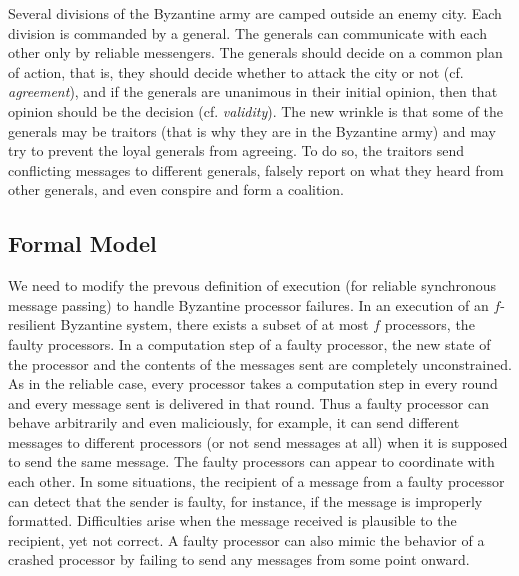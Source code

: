 \documentclass{article}
\begin{document}
Several divisions of the Byzantine army are camped outside an enemy city. Each division is commanded by a general. The generals can communicate with each other only by reliable messengers. The generals should decide on a common plan of action, that is, they should decide whether to attack the city or not (cf. \textit{agreement}), and if the generals are unanimous in their initial opinion, then that opinion should be the decision (cf. \textit{validity}). The new wrinkle is that some of the generals may be traitors (that is why they are in the Byzantine army) and may try to prevent the loyal generals from agreeing. To do so, the traitors send conflicting messages to different generals, falsely report on what they heard from other generals, and even conspire and form a coalition. 

\subsection{Formal Model} We need to modify the prevous definition of execution (for reliable synchronous message passing) to handle Byzantine processor failures. In an execution of an $f$-resilient Byzantine system, there exists a subset of at most $f$ processors, the faulty processors. In a computation step of a faulty processor, the new state of the processor and the contents of the messages sent are completely unconstrained. As in the reliable case, every processor takes a computation step in every round and every message sent is delivered in that round. Thus a faulty processor can behave arbitrarily and even maliciously, for example, it can send different messages to different processors (or not send messages at all) when it is supposed to send the same message. The faulty processors can appear to coordinate with each other. In some situations, the recipient of a message from a faulty processor can detect that the sender is faulty, for instance, if the message is improperly formatted. Difficulties arise when the message received is plausible to the recipient, yet not correct. A faulty processor can also mimic the behavior of a crashed processor by failing to send any messages from some point onward.
\end{document}

